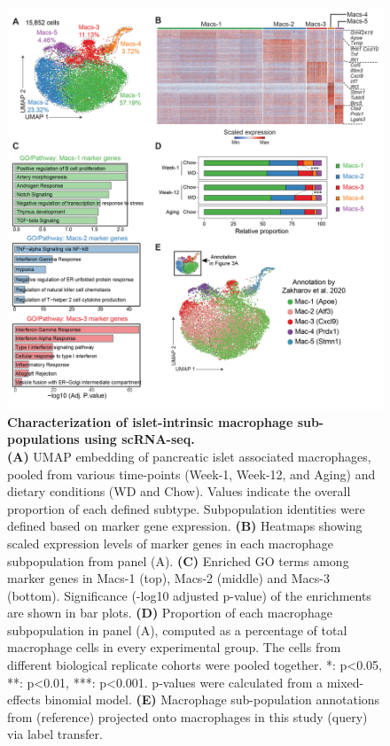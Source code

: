 \begin{figure}[htbp]
\centering
\includegraphics[width=\linewidth]{Chapter4/Fig/F2-5-01.png}
\caption[res-macs1]{\textbf{Characterization of islet-intrinsic macrophage sub-populations using scRNA-seq.}\\
\textbf{(A)} UMAP embedding of pancreatic islet associated macrophages, pooled from various time-points (Week-1, Week-12, and Aging) and dietary conditions (WD and Chow). Values indicate the overall proportion of each defined subtype. Subpopulation identities were defined based on marker gene expression. \textbf{(B)} Heatmaps showing scaled expression levels of marker genes in each macrophage subpopulation from panel (A). \textbf{(C)} Enriched GO terms among marker genes in Macs-1 (top), Macs-2 (middle) and Macs-3 (bottom). Significance (-log10 adjusted p-value) of the enrichments are shown in bar plots. \textbf{(D)} Proportion of each macrophage subpopulation in panel (A), computed as a percentage of total macrophage cells in every experimental group. The cells from different biological replicate cohorts were pooled together. *: p<0.05, **: p<0.01, ***: p<0.001. p-values were calculated from a mixed-effects binomial model. \textbf{(E)} Macrophage sub-population annotations from \textbf{\cite{zakharov_single-cell_2020}} (reference) projected onto macrophages in this study (query) via label transfer.}
\label{fig2-5}
\end{figure}


